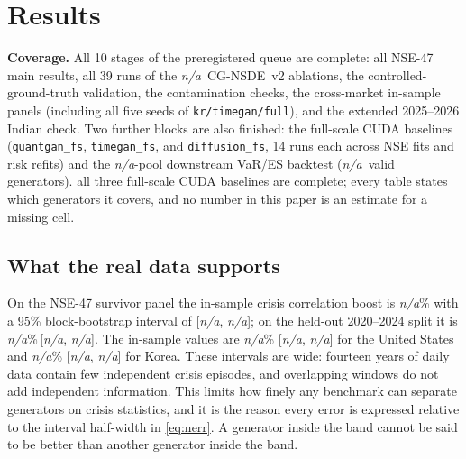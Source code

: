 \documentclass[journal]{IEEEtran}
\newcommand{\pendingnum}{\textit{n/a}}
\providecommand{\realNseBoost}{\pendingnum}
\providecommand{\realNseBoostLo}{\pendingnum}
\providecommand{\realNseBoostHi}{\pendingnum}
\providecommand{\realNseHeldBoost}{\pendingnum}
\providecommand{\realNseHeldBoostLo}{\pendingnum}
\providecommand{\realNseHeldBoostHi}{\pendingnum}
\providecommand{\realUsBoost}{\pendingnum}
\providecommand{\realUsBoostLo}{\pendingnum}
\providecommand{\realUsBoostHi}{\pendingnum}
\providecommand{\realKrBoost}{\pendingnum}
\providecommand{\realKrBoostLo}{\pendingnum}
\providecommand{\realKrBoostHi}{\pendingnum}
\providecommand{\nGenerators}{\pendingnum}
\providecommand{\nRiskGenerators}{\pendingnum}
\providecommand{\nAblationVariants}{\pendingnum}
\begin{document}
\section{Results}
\label{sec:results}
\textbf{Coverage.} All 10 stages of the preregistered queue are complete: all NSE-47 main results, all 39 runs
of the \nAblationVariants\ CG-NSDE~v2 ablations, the controlled-ground-truth validation, the contamination
checks, the cross-market in-sample panels (including all five seeds of \texttt{kr/timegan/full}), and the
extended 2025--2026 Indian check. Two further blocks are also finished: the full-scale CUDA baselines
(\texttt{quantgan\_fs}, \texttt{timegan\_fs}, and \texttt{diffusion\_fs}, 14 runs each across NSE fits and risk refits) and the
\nGenerators-pool downstream VaR/ES backtest (\nRiskGenerators\ valid generators). all three full-scale CUDA baselines are complete; every table states which generators it covers, and no number in
this paper is an estimate for a missing cell.

\subsection{What the real data supports}
On the NSE-47 survivor panel the in-sample crisis correlation boost is \realNseBoost\% with a 95\%
block-bootstrap interval of [\realNseBoostLo, \realNseBoostHi]; on the held-out 2020--2024 split it is
\realNseHeldBoost\%\,[\realNseHeldBoostLo, \realNseHeldBoostHi]. The in-sample values are \realUsBoost\%
[\realUsBoostLo, \realUsBoostHi] for the United States and \realKrBoost\% [\realKrBoostLo, \realKrBoostHi]
for Korea. These intervals are wide: fourteen years of daily data contain few independent crisis episodes,
and overlapping windows do not add independent information. This limits how finely any benchmark can separate
generators on crisis statistics, and it is the reason every error is expressed relative to the interval
half-width in \eqref{eq:nerr}. A generator inside the band cannot be said to be better than another generator
inside the band.
\end{document}
